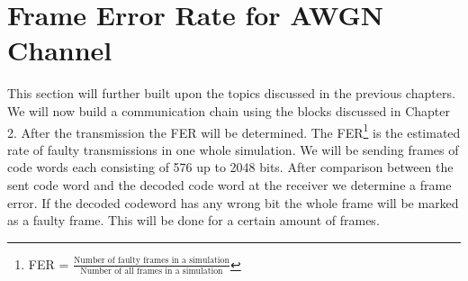 \chapter{Frame Error Rate for AWGN Channel}
 \label{chap:AWGN chain}
\graphicspath{{C:/Users/Kevin/Bachelarbeit/Bachelorarbeit/01_Bachelorarbeit_LaTex/02_Figures/}}

This section will further built upon the topics discussed in the previous chapters. We will now build a communication chain using the blocks discussed in Chapter 2. After the transmission the \gls{FER} will be determined. The \gls{FER}\footnote{FER = $\frac{\textrm{Number of faulty frames in a simulation}}{\textrm{Number of all frames in a simulation}}$} is the estimated rate of faulty transmissions in one whole simulation. We will be sending frames of code words each consisting of 576 up to 2048 bits. After comparison between the sent code word and the decoded code word at the receiver we determine a frame error. If the decoded codeword has any wrong bit the whole frame will be marked as a faulty frame. This will be done for a certain amount of frames.

